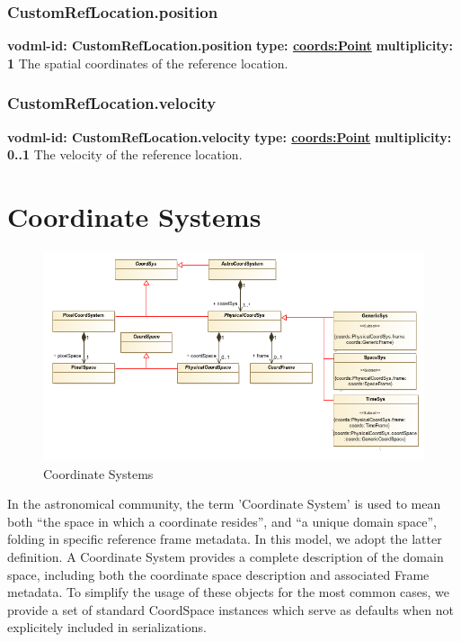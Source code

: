     \subsubsection{CustomRefLocation.position}
      \textbf{vodml-id: CustomRefLocation.position} \newline
      \textbf{type: \hyperref[sect:Point]{coords:Point}} \newline
      \textbf{multiplicity: 1} \newline 
      The spatial coordinates of the reference location.

    \subsubsection{CustomRefLocation.velocity}
      \textbf{vodml-id: CustomRefLocation.velocity} \newline
      \textbf{type: \hyperref[sect:Point]{coords:Point}} \newline
      \textbf{multiplicity: 0..1} \newline 
      The velocity of the reference location.


\pagebreak
\section{Coordinate Systems}

  \begin{figure}[h]
  \begin{center}
    \includegraphics[width=5.25in]{diagrams/CoordSystems.png}
    \caption{Coordinate Systems }\label{fig:coordsys}
  \end{center}
  \end{figure}

  In the astronomical community, the term 'Coordinate System' is used to mean both ``the space in which a coordinate resides'', and ``a unique domain space'', folding in specific reference frame metadata.  In this model, we adopt the latter definition.  A Coordinate System provides a complete description of the domain space, including both the coordinate space description and associated Frame metadata.  To simplify the usage of these objects for the most common cases, we provide a set of standard CoordSpace instances which serve as defaults when not explicitely included in serializations.


